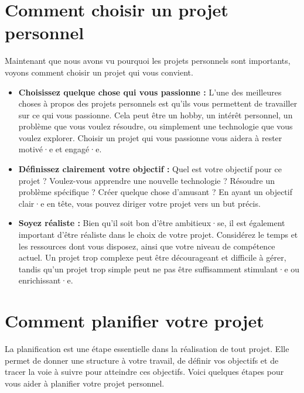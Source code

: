 \section{Comment choisir un projet personnel}

Maintenant que nous avons vu pourquoi les projets personnels sont importants, voyons comment choisir un projet qui vous convient.

\begin{itemize}
    \item \textbf{Choisissez quelque chose qui vous passionne :} L'une des meilleures choses à propos des projets personnels est qu'ils vous permettent de travailler sur ce qui vous passionne. Cela peut être un hobby, un intérêt personnel, un problème que vous voulez résoudre, ou simplement une technologie que vous voulez explorer. Choisir un projet qui vous passionne vous aidera à rester motivé·e et engagé·e.

    \item \textbf{Définissez clairement votre objectif :} Quel est votre objectif pour ce projet ? Voulez-vous apprendre une nouvelle technologie ? Résoudre un problème spécifique ? Créer quelque chose d'amusant ? En ayant un objectif clair·e en tête, vous pouvez diriger votre projet vers un but précis.

    \item \textbf{Soyez réaliste :} Bien qu'il soit bon d'être ambitieux·se, il est également important d'être réaliste dans le choix de votre projet. Considérez le temps et les ressources dont vous disposez, ainsi que votre niveau de compétence actuel. Un projet trop complexe peut être décourageant et difficile à gérer, tandis qu'un projet trop simple peut ne pas être suffisamment stimulant·e ou enrichissant·e.
\end{itemize}

\section{Comment planifier votre projet}

La planification est une étape essentielle dans la réalisation de tout projet. Elle permet de donner une structure à votre travail, de définir vos objectifs et de tracer la voie à suivre pour atteindre ces objectifs. Voici quelques étapes pour vous aider à planifier votre projet personnel.

